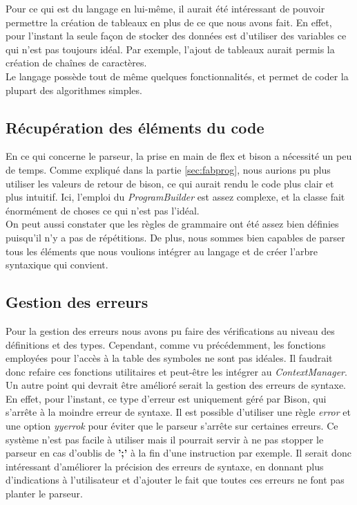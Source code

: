 \documentclass[a4paper]{article}%
\begin{document}
Pour ce qui est du langage en lui-même, il aurait été intéressant de pouvoir
permettre la création de tableaux en plus de ce que nous avons fait. En effet,
pour l'instant la seule façon de stocker des données est d'utiliser des
variables ce qui n'est pas toujours idéal. Par exemple, l'ajout de tableaux
aurait permis la création de chaînes de caractères.\\

Le langage possède tout de même quelques fonctionnalités, et permet de coder la
plupart des algorithmes simples.

\subsection{Récupération des éléments du code}

En ce qui concerne le parseur, la prise en main de flex et bison a nécessité un
peu de temps. Comme expliqué dans la partie \ref{sec:fabprog}, nous aurions pu
plus utiliser les valeurs de retour de bison, ce qui aurait rendu le code plus
clair et plus intuitif. Ici, l'emploi du \textit{ProgramBuilder} est assez
complexe, et la classe fait énormément de choses ce qui n'est pas l'idéal.\\

On peut aussi constater que les règles de grammaire ont été assez bien définies
puisqu'il n'y a pas de répétitions. De plus, nous sommes bien capables de parser
tous les éléments que nous voulions intégrer au langage et de créer l'arbre
syntaxique qui convient.

\subsection{Gestion des erreurs}

Pour la gestion des erreurs nous avons pu faire des vérifications au niveau des
définitions et des types. Cependant, comme vu précédemment, les fonctions
employées pour l'accès à la table des symboles ne sont pas idéales. Il faudrait
donc refaire ces fonctions utilitaires et peut-être les intégrer au
\textit{ContextManager}.\\

Un autre point qui devrait être amélioré serait la gestion des erreurs de
syntaxe. En effet, pour l'instant, ce type d'erreur est uniquement géré par
Bison, qui s'arrête à la moindre erreur de syntaxe. Il est possible d'utiliser
une règle \textit{error} et une option \textit{yyerrok} pour éviter que le
parseur s'arrête sur certaines erreurs. Ce système n'est pas facile à utiliser
mais il pourrait servir à ne pas stopper le parseur en cas d'oublis de
\textbf{';'} à la fin d'une instruction par exemple. Il serait donc intéressant
d'améliorer la précision des erreurs de syntaxe, en donnant plus d'indications à
l'utilisateur et d'ajouter le fait que toutes ces erreurs ne font pas planter le
parseur.\\
\end{document}
